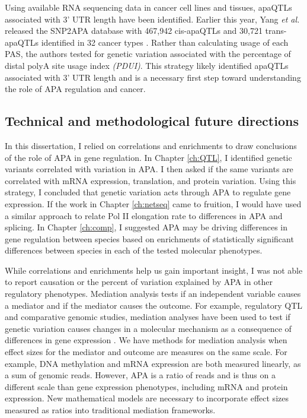  
Using available RNA sequencing data in cancer cell lines and tissues, apaQTLs associated with 3' UTR length have been identified. Earlier this year, Yang \emph{et al.} released the SNP2APA database with 467,942 cis-apaQTLs and 30,721 trans-apaQTLs identified in 32 cancer types \citep{yang 2020}. Rather than calculating usage of each PAS, the authors tested for genetic variation associated with the percentage of distal polyA site usage index \emph{(PDUI)}. This strategy likely identified apaQTLs associated with 3' UTR length and is a necessary first step toward understanding the role of APA regulation and cancer. 



\subsection{Technical and methodological future directions}

In this dissertation, I relied on correlations and enrichments to draw conclusions of the role of APA in gene regulation. In Chapter \ref{ch:QTL}, I identified genetic variants correlated with variation in APA. I then asked if the same variants are correlated with mRNA expression, translation, and protein variation. Using this strategy, I concluded that genetic variation acts through APA to regulate gene expression. If the work in Chapter \ref{ch:netseq} came to fruition, I would have used a similar approach to relate Pol II elongation rate to differences in APA and splicing. In Chapter \ref{ch:comp}, I suggested APA may be driving differences in gene regulation between species based on enrichments of statistically significant differences between species in each of the tested molecular phenotypes. 

While correlations and enrichments help us gain important insight, I was not able to report causation or the percent of variation explained by APA in other regulatory phenotypes. Mediation analysis tests if an independent variable causes a mediator and if the mediator causes the outcome. For example, regulatory QTL and comparative genomic studies, mediation analyses have been used to test if genetic variation causes changes in a molecular mechanism as a consequence of differences in gene expression \citep{pierce_co-occurring_2018, park_bayesian_2017, blake_comparison_2020, eres_reorganization_2019}. We have methods for mediation analysis when effect sizes for the mediator and outcome are measures on the same scale. For example, DNA methylation and mRNA expression are both measured linearly, as a sum of genomic reads. However, APA is a ratio of reads and is thus on a different scale than gene expression phenotypes, including mRNA and protein expression. New mathematical models are necessary to incorporate effect sizes measured as ratios into traditional mediation frameworks. 


